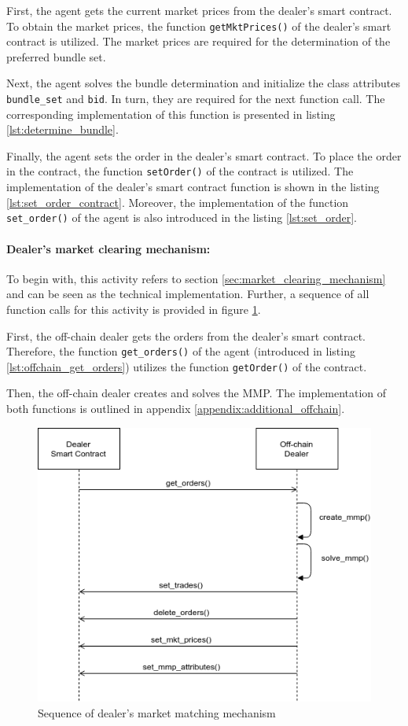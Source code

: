 First, the agent gets the current market prices from the dealer's smart contract.
To obtain the market prices, the function \verb|getMktPrices()| of the dealer's smart contract is utilized.
The market prices are required for the determination of the preferred bundle set.

Next, the agent solves the bundle determination and initialize the class attributes
\verb|bundle_set| and \verb|bid|.
In turn, they are required for the next function call.
The corresponding implementation of this function is presented in listing \ref{lst:determine_bundle}.

Finally, the agent sets the order in the dealer's smart contract.
To place the order in the contract, the function \verb|setOrder()| of the contract is utilized.
The implementation of the dealer's smart contract function is shown in the listing \ref{lst:set_order_contract}.
Moreover, the implementation of the function \verb|set_order()| of the agent is 
also introduced in the listing \ref{lst:set_order}.

\paragraph{Dealer's market clearing mechanism:}
To begin with, this activity refers to section \ref{sec:market_clearing_mechanism} and can be seen as
the technical implementation. Further, a sequence of all function 
calls for this activity is provided in figure \ref{figure:dealers_mmp}.

First, the off-chain dealer gets the orders from the dealer's smart contract.
Therefore, the function \verb|get_orders()| of the agent (introduced in listing \ref{lst:offchain_get_orders})
utilizes the function \verb|getOrder()| of the contract.

Then, the off-chain dealer creates and solves the MMP.
The implementation of both functions is outlined in appendix \ref{appendix:additional_offchain}.

\begin{figure}[htbp]
	\centering
	\includegraphics[width=.8\linewidth]{./figures/dealers_mmp.png}
	\caption{Sequence of dealer's market matching mechanism}
	\label{figure:dealers_mmp}
\end{figure}

